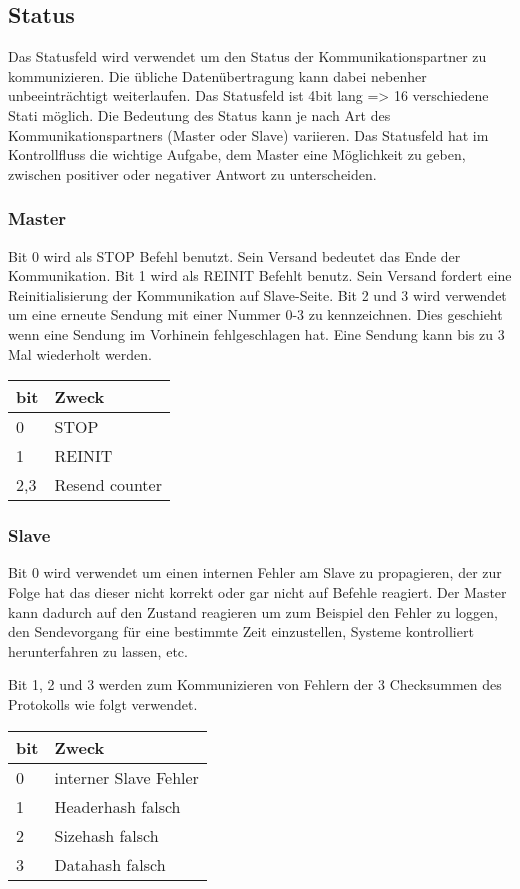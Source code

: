 \subsection{Status}

Das Statusfeld wird verwendet um den Status der Kommunikationspartner zu kommunizieren.
Die übliche Datenübertragung kann dabei nebenher unbeeinträchtigt weiterlaufen.
Das Statusfeld ist 4bit lang => 16 verschiedene Stati möglich.
Die Bedeutung des Status kann je nach Art des Kommunikationspartners (Master oder Slave) variieren.
Das Statusfeld hat im Kontrollfluss die wichtige Aufgabe, dem Master eine Möglichkeit zu geben, zwischen positiver oder negativer Antwort zu unterscheiden.

\subsubsection{Master}

Bit 0 wird als STOP Befehl benutzt. Sein Versand bedeutet das Ende der Kommunikation.
Bit 1 wird als REINIT Befehlt benutz. Sein Versand fordert eine Reinitialisierung der Kommunikation auf Slave-Seite.
Bit 2 und 3 wird verwendet um eine erneute Sendung mit einer Nummer 0-3 zu kennzeichnen. Dies geschieht wenn eine Sendung im Vorhinein fehlgeschlagen hat. Eine Sendung kann bis zu 3 Mal wiederholt werden.

\begin{tabular}{l | l}
	bit & Zweck \\
	\hline \hline
	0 & STOP \\
	1 & REINIT \\
	2,3 & Resend counter
\end{tabular}

\subsubsection{Slave}

Bit 0 wird verwendet um einen internen Fehler am Slave zu propagieren, der zur Folge hat das dieser nicht korrekt oder gar nicht auf Befehle reagiert. Der Master kann dadurch auf den Zustand reagieren um zum Beispiel den Fehler zu loggen, den Sendevorgang für eine bestimmte Zeit einzustellen, Systeme kontrolliert herunterfahren zu lassen, etc.

Bit 1, 2 und 3 werden zum Kommunizieren von Fehlern der 3 Checksummen des Protokolls wie folgt verwendet.

\begin{tabular}{l | l}
	bit & Zweck \\
	\hline \hline
	0 & interner Slave Fehler \\
	1 & Headerhash falsch \\
	2 & Sizehash falsch \\
	3 & Datahash falsch
\end{tabular}



